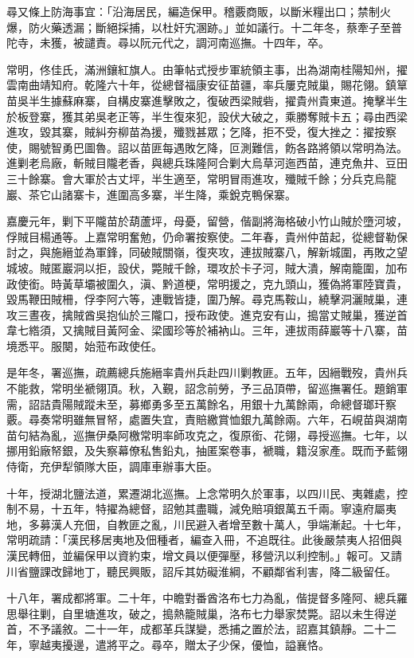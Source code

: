 \begin{pinyinscope}
尋又條上防海事宜：「沿海居民，編造保甲。稽覈商販，以斷米糧出口；禁制火爆，防火藥透漏；斷絕採捕，以杜奸宄溷跡。」並如議行。十二年冬，蔡牽子至普陀寺，未獲，被譴責。尋以阮元代之，調河南巡撫。十四年，卒。

常明，佟佳氏，滿洲鑲紅旗人。由筆帖式授步軍統領主事，出為湖南桂陽知州，擢雲南曲靖知府。乾隆六十年，從總督福康安征苗疆，率兵屢克賊巢，賜花翎。鎮筸苗吳半生據蘇麻寨，自構皮寨進擊敗之，復破西梁賊砦，擢貴州貴東道。掩擊半生於板登寨，獲其弟吳老正等，半生復來犯，設伏大破之，乘勝奪賊卡五；尋由西梁進攻，毀其寨，賊糾夯柳苗為援，殲戮甚眾；乞降，拒不受，復大挫之：擢按察使，賜號智勇巴圖魯。詔以苗匪每遇敗乞降，叵測難信，飭各路將領以常明為法。進剿老烏廠，斬賊目隴老香，與總兵珠隆阿合剿大烏草河迤西苗，連克魚井、豆田三十餘寨。會大軍於古丈坪，半生適至，常明冒雨進攻，殲賊千餘；分兵克烏龍巖、茶它山諸寨卡，進圍高多寨，半生降，乘銳克鴨保寨。

嘉慶元年，剿下平隴苗於葫蘆坪，母憂，留營，偕副將海格破小竹山賊於墮河坡，俘賊目楊通等。上嘉常明奮勉，仍命署按察使。二年春，貴州仲苗起，從總督勒保討之，與施縉並為軍鋒，同破賊關嶺，復夾攻，連拔賊寨八，解新城圍，再敗之望城坡。賊匿巖洞以拒，設伏，斃賊千餘，環攻於卡子河，賊大潰，解南籠圍，加布政使銜。時黃草壩被圍久，滇、黔道梗，常明援之，克九頭山，獲偽將軍陸寶貴，毀馬鞭田賊柵，俘李阿六等，連戰皆捷，圍乃解。尋克馬鞍山，繞擊洞灑賊巢，連攻三晝夜，擒賊酋吳抱仙於三隴口，授布政使。進克安有山，搗當丈賊巢，獲逆首韋七綹須，又擒賊目黃阿金、梁國珍等於補衲山。三年，連拔雨薛巖等十八寨，苗境悉平。服闋，始蒞布政使任。

是年冬，署巡撫，疏薦總兵施縉率貴州兵赴四川剿教匪。五年，因縉戰歿，貴州兵不能救，常明坐褫翎頂。秋，入覲，詔念前勞，予三品頂帶，留巡撫署任。題銷軍需，詔詰貴陽賊蹤未至，募鄉勇多至五萬餘名，用銀十九萬餘兩，命總督瑯玕察覈。尋奏常明雖無冒帑，處置失宜，責賠繳賞恤銀九萬餘兩。六年，石峴苗與湖南苗句結為亂，巡撫伊桑阿檄常明率師攻克之，復原銜、花翎，尋授巡撫。七年，以挪用鉛廠帑銀，及失察幕僚私售鉛丸，抽匿案卷事，褫職，籍沒家產。既而予藍翎侍衛，充伊犁領隊大臣，調庫車辦事大臣。

十年，授湖北鹽法道，累遷湖北巡撫。上念常明久於軍事，以四川民、夷雜處，控制不易，十五年，特擢為總督，詔勉其盡職，減免賠項銀萬五千兩。寧遠府屬夷地，多募漢人充佃，自教匪之亂，川民避入者增至數十萬人，爭端漸起。十七年，常明疏請：「漢民移居夷地及佃種者，編查入冊，不追既往。此後嚴禁夷人招佃與漢民轉佃，並編保甲以資約束，增文員以便彈壓，移營汛以利控制。」報可。又請川省鹽課改歸地丁，聽民興販，詔斥其妨礙淮綱，不顧鄰省利害，降二級留任。

十八年，署成都將軍。二十年，中瞻對番酋洛布七力為亂，偕提督多隆阿、總兵羅思舉往剿，自里塘進攻，破之，搗熱籠賊巢，洛布七力舉家焚斃。詔以未生得逆首，不予議敘。二十一年，成都革兵謀變，悉捕之置於法，詔嘉其鎮靜。二十二年，寧越夷擾邊，遣將平之。尋卒，贈太子少保，優恤，謚襄恪。


\end{pinyinscope}
